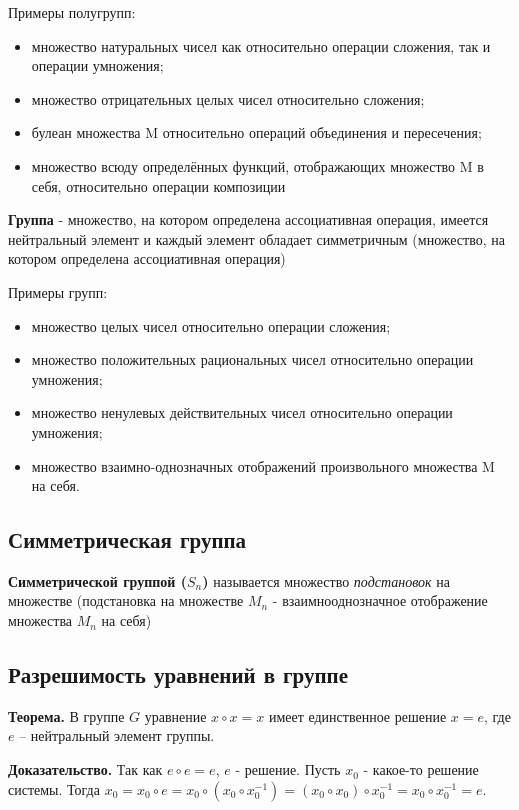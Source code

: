 \documentclass[a4paper]{article}
\begin{document}
Примеры полугрупп:
\begin{itemize}
\item множество натуральных чисел как относительно операции сложения, так и
операции умножения;
\item множество отрицательных целых чисел относительно сложения;
\item булеан множества M относительно операций объединения и пересечения;
\item множество всюду определённых функций, отображающих множество M в
себя, относительно операции композиции
\end{itemize}

\textbf{Группа} - множество, на котором определена ассоциативная операция, имеется нейтральный элемент и каждый элемент обладает симметричным (множество, на котором определена ассоциативная операция)

Примеры групп:
\begin{itemize}
\item множество целых чисел относительно операции сложения;
\item множество положительных рациональных чисел относительно операции
умножения;
\item множество ненулевых действительных чисел относительно операции
умножения;
\item множество взаимно-однозначных отображений произвольного множества M на себя.
\end{itemize}

\subsection*{Симметрическая группа}
\textbf{Симметрической группой ($S_n$)} называется множество \textit{подстановок} на множестве (подстановка на множестве $M_n$ - взаимнооднозначное отображение множества $M_n$ на себя)

\subsection*{Разрешимость уравнений в группе
}
\begin{htheorem}
\textbf{Теорема.}  В группе  $G$ уравнение $x \circ x = x$ имеет
единственное решение $x = e$, где $e$ – нейтральный элемент группы.
\end{htheorem}

\begin{hproof}
\textbf{Доказательство.} Так как $e \circ e = e$, $e$ - решение. Пусть $x_0$ - какое-то решение системы. Тогда $x_0 = x_0 \circ e = x_0 \circ (x_0 \circ x_0^{-1}) = (x_0 \circ x_0) \circ x_0^{-1} = x_0 \circ x_0^{-1} = e$.
\end{hproof}
\end{document}
